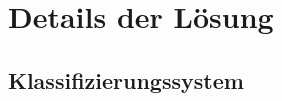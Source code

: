 \chapter{Details der Lösung}
    \label{chapter:SolutionDetails}

    \section{Klassifizierungssystem}

